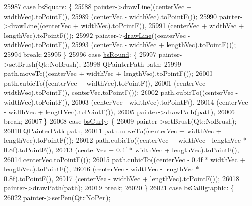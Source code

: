 \begin{DoxyCode}
25987     \textcolor{keywordflow}{case} \hyperlink{class_q_c_p_item_bracket_a7ac3afd0b24a607054e7212047d59dbda7f9df4a7359bfe3dac1dbe4ccf5d220c}{bsSquare}: \{
25988       painter->\hyperlink{class_q_c_p_painter_a0b4b1b9bd495e182c731774dc800e6e0}{drawLine}((centerVec + widthVec).toPointF(),
25989                         (centerVec - widthVec).toPointF());
25990       painter->\hyperlink{class_q_c_p_painter_a0b4b1b9bd495e182c731774dc800e6e0}{drawLine}((centerVec + widthVec).toPointF(),
25991                         (centerVec + widthVec + lengthVec).toPointF());
25992       painter->\hyperlink{class_q_c_p_painter_a0b4b1b9bd495e182c731774dc800e6e0}{drawLine}((centerVec - widthVec).toPointF(),
25993                         (centerVec - widthVec + lengthVec).toPointF());
25994       \textcolor{keywordflow}{break};
25995     \}
25996     \textcolor{keywordflow}{case} \hyperlink{class_q_c_p_item_bracket_a7ac3afd0b24a607054e7212047d59dbda394627b0830a26ee3e0a02ca67a9f918}{bsRound}: \{
25997       painter->setBrush(Qt::NoBrush);
25998       QPainterPath path;
25999       path.moveTo((centerVec + widthVec + lengthVec).toPointF());
26000       path.cubicTo((centerVec + widthVec).toPointF(),
26001                    (centerVec + widthVec).toPointF(), centerVec.toPointF());
26002       path.cubicTo((centerVec - widthVec).toPointF(),
26003                    (centerVec - widthVec).toPointF(),
26004                    (centerVec - widthVec + lengthVec).toPointF());
26005       painter->drawPath(path);
26006       \textcolor{keywordflow}{break};
26007     \}
26008     \textcolor{keywordflow}{case} \hyperlink{class_q_c_p_item_bracket_a7ac3afd0b24a607054e7212047d59dbda5024ce4023c2d8de4221f1cd4816acd8}{bsCurly}: \{
26009       painter->setBrush(Qt::NoBrush);
26010       QPainterPath path;
26011       path.moveTo((centerVec + widthVec + lengthVec).toPointF());
26012       path.cubicTo((centerVec + widthVec - lengthVec * 0.8f).toPointF(),
26013                    (centerVec + 0.4f * widthVec + lengthVec).toPointF(),
26014                    centerVec.toPointF());
26015       path.cubicTo((centerVec - 0.4f * widthVec + lengthVec).toPointF(),
26016                    (centerVec - widthVec - lengthVec * 0.8f).toPointF(),
26017                    (centerVec - widthVec + lengthVec).toPointF());
26018       painter->drawPath(path);
26019       \textcolor{keywordflow}{break};
26020     \}
26021     \textcolor{keywordflow}{case} \hyperlink{class_q_c_p_item_bracket_a7ac3afd0b24a607054e7212047d59dbda8f29f5ef754e2dc9a9efdedb2face0f3}{bsCalligraphic}: \{
26022       painter->\hyperlink{class_q_c_p_painter_af9c7a4cd1791403901f8c5b82a150195}{setPen}(Qt::NoPen);

\end{DoxyCode}
